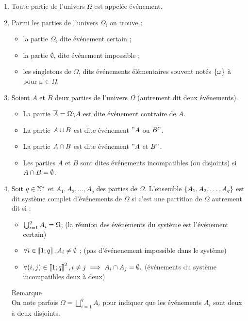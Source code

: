 \begin{defprop}[Evénements]
    \begin{enumerate}
        \item Toute partie de l’univers \(\Omega\) est appelée événement.
        \item Parmi les parties de l’univers \(\Omega\), on trouve :
            \begin{itemize}
                \item la partie \(\Omega\), dite événement certain ;
                \item la partie \(\emptyset\), dite événement impossible ;
                \item les singletons de \(\Omega\), dits événements élémentaires souvent notés \(\left\lbrace\omega\right\rbrace\) à pour \(\omega \in \Omega\).
            \end{itemize}
        \item Soient \(A\) et \(B\) deux parties de l’univers \(\Omega\) (autrement dit deux événements).
            \begin{itemize}
                \item La partie \(\overline{A} = \Omega \backslash A\) est dite événement contraire de \(A\).
                \item La partie \(A \cup B\) est dite événement \("A\) ou \(B"\).
                \item La partie \(A \cap B\) est dite événement \("A\) et \(B"\).
                \item Les parties \(A\) et \(B\) sont dites événements incompatibles (ou disjoints) si \(A \cap B = \emptyset\).
            \end{itemize}
        \item Soit   \( q \in \mathbb{N}^*\) et \(A_1, A_2, \dots , A_q\) des parties de \(\Omega\).
        L’ensemble  \(\left\lbrace A_1, A_2, \dots , A_q\right\rbrace\) est dit système complet d’événements de \(\Omega\) si c’est une partition de \(\Omega\) autrement dit si :
        \begin{itemize}
            \item \(\bigcup_{i=1}^q A_i = \Omega \); \hfill (la réunion des événements du système est l’événement certain)
            \item \(\forall  i \in \left\llbracket1;q\right\rrbracket , A_i\neq \emptyset\) ; \hfill(pas d’événenement impossible dans le système)
            \item \(\forall (i, j) \in \left\llbracket1;q\right\rrbracket^2 , i\neq j \implies A_i \cap A_j = \emptyset.\) (événements du système incompatibles deux à deux)
        \end{itemize}
        \underline{Remarque}\\
        On note parfois \(\Omega = \bigsqcup^q_{i=1} A_i\) pour indiquer que les événements \(A_i\) sont deux à deux disjoints.
    \end{enumerate}
\end{defprop}

